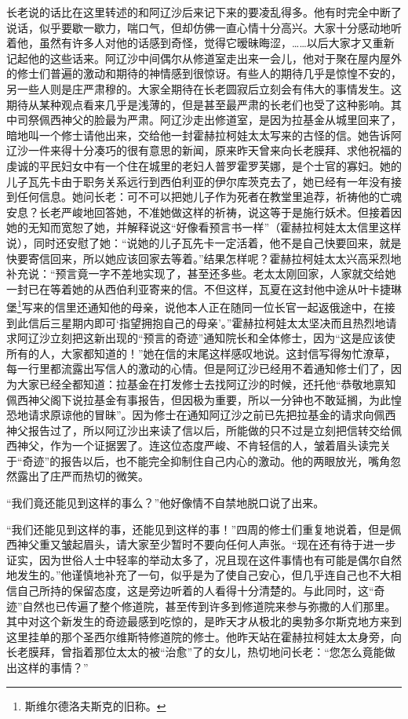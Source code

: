 \par 长老说的话比在这里转述的和阿辽沙后来记下来的要凌乱得多。他有时完全中断了说话，似乎要歇一歇力，喘口气，但却仿佛一直心情十分高兴。大家十分感动地听着他，虽然有许多人对他的话感到奇怪，觉得它暧昧晦涩，……以后大家才又重新记起他的这些话来。阿辽沙中间偶尔从修道室走出来一会儿，他对于聚在屋内屋外的修士们普遍的激动和期待的神情感到很惊讶。有些人的期待几乎是惊惶不安的，另一些人则是庄严肃穆的。大家全期待在长老圆寂后立刻会有伟大的事情发生。这期待从某种观点看来几乎是浅薄的，但是甚至最严肃的长老们也受了这种影响。其中司祭佩西神父的脸最为严肃。阿辽沙走出修道室，是因为拉基金从城里回来了，暗地叫一个修士请他出来，交给他一封霍赫拉柯娃太太写来的古怪的信。她告诉阿辽沙一件来得十分凑巧的很有意思的新闻，原来昨天曾来向长老膜拜、求他祝福的虔诚的平民妇女中有一个住在城里的老妇人普罗霍罗芙娜，是个士官的寡妇。她的儿子瓦先卡由于职务关系远行到西伯利亚的伊尔库茨克去了，她已经有一年没有接到任何信息。她问长老：可不可以把她儿子作为死者在教堂里追荐，祈祷他的亡魂安息？长老严峻地回答她，不准她做这样的祈祷，说这等于是施行妖术。但接着因她的无知而宽恕了她，并解释说这“好像看预言书一样”（霍赫拉柯娃太太信里这样说），同时还安慰了她：“说她的儿子瓦先卡一定活着，他不是自己快要回来，就是快要寄信回来，所以她应该回家去等着。”结果怎样呢？霍赫拉柯娃太太兴高采烈地补充说：“预言竟一字不差地实现了，甚至还多些。老太太刚回家，人家就交给她一封已在等着她的从西伯利亚寄来的信。不但这样，瓦夏在这封他中途从叶卡捷琳堡\footnote{斯维尔德洛夫斯克的旧称。}写来的信里还通知他的母亲，说他本人正在随同一位长官一起返俄途中，在接到此信后三星期内即可‘指望拥抱自己的母亲’。”霍赫拉柯娃太太坚决而且热烈地请求阿辽沙立刻把这新出现的“预言的奇迹”通知院长和全体修士，因为“这是应该使所有的人，大家都知道的！”她在信的末尾这样感叹地说。这封信写得匆忙潦草，每一行里都流露出写信人的激动的心情。但是阿辽沙已经用不着通知修士们了，因为大家已经全都知道：拉基金在打发修士去找阿辽沙的时候，还托他“恭敬地禀知佩西神父阁下说拉基金有事报告，但因极为重要，所以一分钟也不敢延搁，为此惶恐地请求原谅他的冒昧”。因为修士在通知阿辽沙之前已先把拉基金的请求向佩西神父报告过了，所以阿辽沙出来读了信以后，所能做的只不过是立刻把信转交给佩西神父，作为一个证据罢了。连这位态度严峻、不肯轻信的人，皱着眉头读完关于“奇迹”的报告以后，也不能完全抑制住自己内心的激动。他的两眼放光，嘴角忽然露出了庄严而热切的微笑。
\par “我们竟还能见到这样的事么？”他好像情不自禁地脱口说了出来。
\par “我们还能见到这样的事，还能见到这样的事！”四周的修士们重复地说着，但是佩西神父重又皱起眉头，请大家至少暂时不要向任何人声张。“现在还有待于进一步证实，因为世俗人士中轻率的举动太多了，况且现在这件事情也有可能是偶尔自然地发生的。”他谨慎地补充了一句，似乎是为了使自己安心，但几乎连自己也不大相信自己所持的保留态度，这是旁边听着的人看得十分清楚的。与此同时，这“奇迹”自然也已传遍了整个修道院，甚至传到许多到修道院来参与弥撒的人们那里。其中对这个新发生的奇迹最感到吃惊的，是昨天才从极北的奥勃多尔斯克地方来到这里挂单的那个圣西尔维斯特修道院的修士。他昨天站在霍赫拉柯娃太太身旁，向长老膜拜，曾指着那位太太的被“治愈”了的女儿，热切地问长老：“您怎么竟能做出这样的事情？”
